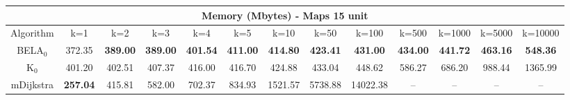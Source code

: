 \begin{tabular}{c|cccccccccccc}\toprule
\multicolumn{13}{c}{Memory (Mbytes) - Maps 15 unit}\\ \midrule
Algorithm & k=1 & k=2 & k=3 & k=4 & k=5 & k=10 & k=50 & k=100 & k=500 & k=1000 & k=5000 & k=10000 \\ \midrule
BELA$_0$ & 372.35 & \textbf{389.00} & \textbf{389.00} & \textbf{401.54} & \textbf{411.00} & \textbf{414.80} & \textbf{423.41} & \textbf{431.00} & \textbf{434.00} & \textbf{441.72} & \textbf{463.16} & \textbf{548.36} \\
K$_0$ & 401.20 & 402.51 & 407.37 & 416.00 & 416.70 & 424.88 & 433.04 & 448.62 & 586.27 & 686.20 & 988.44 & 1365.99 \\
mDijkstra & \textbf{257.04} & 415.81 & 582.00 & 702.37 & 834.93 & 1521.57 & 5738.88 & 14022.38 & -- & -- & -- & -- \\ \bottomrule 
\end{tabular}
